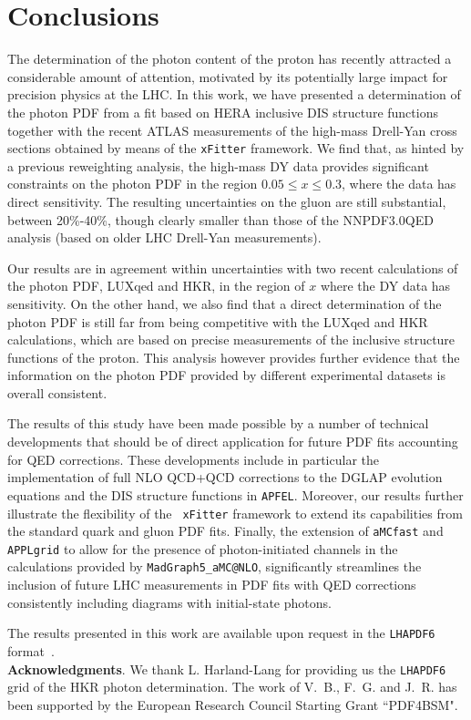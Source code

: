 \section{Conclusions}
\label{sec:conclusions}

The determination of the photon content of the proton has recently
attracted a considerable amount of attention, motivated by its
potentially large impact for precision physics at the LHC.
%
In this work, we have presented a determination of the photon PDF from
a fit based on HERA inclusive DIS structure functions together with
the recent ATLAS measurements of the high-mass Drell-Yan cross
sections obtained by means of the {\tt xFitter} framework.
%
We find that, as hinted by a previous reweighting analysis, the
high-mass DY data provides significant constraints on the photon PDF
in the region $0.05 \le x \le 0.3$, where the data has direct
sensitivity.
%
The resulting uncertainties on the gluon are still substantial,
between 20\%-40\%, though clearly smaller than those of the
NNPDF3.0QED analysis (based on older LHC Drell-Yan measurements).

Our results are in agreement within uncertainties with two recent
calculations of the photon PDF, LUXqed and HKR, in the region of $x$
where the DY data has sensitivity.
%
On the other hand, we also find that a direct determination of the
photon PDF is still far from being competitive with the LUXqed and HKR
calculations, which are based on precise measurements of the inclusive
structure functions of the proton.
%
This analysis however provides further evidence that the information
on the photon PDF provided by different experimental datasets is
overall consistent.

The results of this study have been made possible by a number of
technical developments that should be of direct application for future
PDF fits accounting for QED corrections.
%
These developments include in particular the implementation of full NLO
QCD+QCD corrections to the DGLAP evolution equations and the DIS
structure functions in {\tt APFEL}.
%
Moreover, our results further illustrate the flexibility of the {\tt
  xFitter} framework to extend its capabilities from the standard
quark and gluon PDF fits.
%
Finally, the extension of {\tt aMCfast} and {\tt APPLgrid} to allow
for the presence of photon-initiated channels in the calculations
provided by {\tt MadGraph5\_aMC@NLO}, significantly streamlines the
inclusion of future LHC measurements in PDF fits with QED corrections
consistently including diagrams with initial-state photons.

The results presented in this work are available upon
request in the {\tt LHAPDF6} format~\cite{Buckley:2014ana}.\\

{\bf Acknowledgments}.
%
We thank L. Harland-Lang for providing us the {\tt LHAPDF6} grid of
the HKR photon determination.
%
The work of V.~B., F.~G. and J.~R. has been supported by the European
Research Council Starting Grant ``PDF4BSM".




